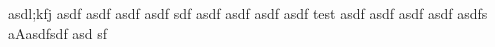 asdl;kfj asdf asdf asdf asdf sdf asdf asdf asdf asdf test asdf asdf asdf asdf asdfs aAasdfsdf asd sf
